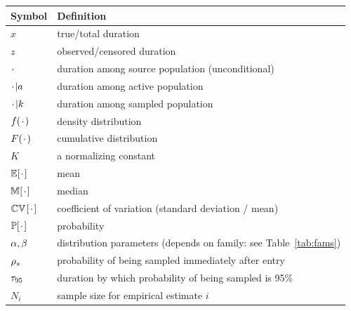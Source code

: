 \begin{tabular}{ll}
  \toprule
  Symbol & Definition \\
  \midrule
  $x$    & true/total duration \\
  $z$    & observed/censored duration \\
  $\x$   & duration among source population (unconditional) \\
  $\x|a$ & duration among active population \\
  $\x|k$ & duration among sampled population \\
  \midrule
  $f(\x)$   & density distribution \\
  $F(\x)$   & cumulative distribution \\
  $K$       & a normalizing constant \\
  $\E[\x]$  & mean \\
  $\M[\x]$  & median \\
  $\CV[\x]$ & coefficient of variation (standard deviation / mean) \\
  $\P[\x]$  & probability \\
  \midrule
  $\aa,\bb$ & distribution parameters (depends on family: see Table~\ref{tab:fams}) \\
  $\pp$     & probability of being sampled immediately after entry \\
  $\tt$     & duration by which probability of being sampled is 95\% \\
  $N_i$     & sample size for empirical estimate $i$ \\
  \bottomrule
\end{tabular}
